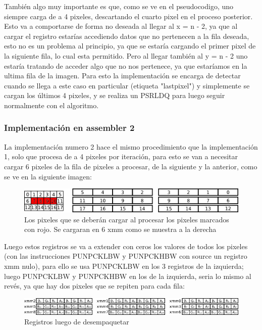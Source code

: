 \documentclass[a4paper]{article}
\begin{document}
También algo muy importante es que, como se ve en el pseudocodigo, uno siempre carga de a 4 pixeles, descartando el cuarto pixel en el proceso posterior. Esto va a comportarse de forma no deseada al llegar al x = n - 2, ya que al cargar el registro estarías accediendo datos que no pertenecen a la fila deseada, esto no es un problema al principio, ya que se estaría cargando el primer pixel de la siguiente fila, lo cual esta permitido. Pero al llegar también al y = n - 2 uno estaría tratando de acceder algo que no nos pertenece, ya que estaríamos en la ultima fila de la imagen. Para esto la implementación se encarga de detectar cuando se llega a este caso en particular (etiqueta "lastpixel") y simplemente se cargan los últimos 4 pixeles, y se realiza un PSRLDQ para luego seguir normalmente con el algoritmo.

\subsubsection{Implementación en assembler 2}

La implementación numero 2 hace el mismo procedimiento que la implementación 1, solo que procesa de a 4 pixeles por iteración, para esto se van a necesitar cargar 6 pixeles de la fila de pixeles a procesar, de la siguiente y la anterior, como se ve en la siguiente imagen:

\begin{figure}[H]
\centering
\includegraphics[scale=0.8]{imagenes/blur2pixels.png}
\caption{Los pixeles que se deberán cargar al procesar los pixeles marcados con rojo. Se cargaran en 6 xmm como se muestra a la derecha}
\label{b2pixels}
\end{figure}

Luego estos registros se va a extender con ceros los valores de todos los pixeles (con las instrucciones PUNPCKLBW y PUNPCKHBW con source un registro xmm nulo), para ello se usa PUNPCKLBW en los 3 registros de la izquierda; luego PUNPCKLBW y PUNPCKHBW en los de la izquierda, seria lo mismo al revés, ya que hay dos pixeles que se repiten para cada fila:

\begin{figure}[H]
\centering
\includegraphics[scale=0.8]{imagenes/blur2unpack.png}
\caption{Registros luego de desempaquetar}
\label{b2unpack}
\end{figure}
\end{document}
